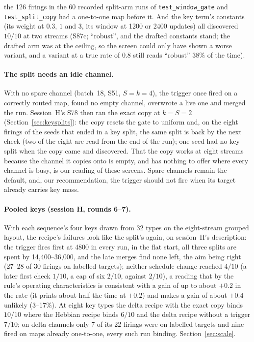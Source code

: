 \documentclass[11pt]{article}
\begin{document}
the 126 firings in the 60 recorded split-arm runs of \texttt{test\_window\_gate} and \texttt{test\_split\_copy} had a one-to-one map before it. And the key term's constants (its weight at $0.3$, $1$ and $3$, its window at 1200 or 2400 updates) all discovered $10/10$ at two streams (S87c; ``robust'', and the drafted constants stand; the drafted arm was at the ceiling, so the screen could only have shown a worse variant, and a variant at a true rate of $0.8$ still reads ``robust'' $38\%$ of the time).

\paragraph{The split needs an idle channel.} With no spare channel (batch~18, S51, $S = k = 4$), the trigger once fired on a correctly routed map, found no empty channel, overwrote a live one and merged the run. Session~H's S78 then ran the exact copy at $k = S = 2$ (Section~\ref{sec:keysplits}): the copy resets the gate to uniform and, on the eight firings of the seeds that ended in a key split, the same split is back by the next check (two of the eight are read from the end of the run); one seed had no key split when the copy came and discovered. That the copy works at eight streams because the channel it copies onto is empty, and has nothing to offer where every channel is busy, is our reading of these screens. Spare channels remain the default, and, our recommendation, the trigger should not fire when its target already carries key mass.

\paragraph{Pooled keys (session H, rounds 6--7).} With each sequence's four keys drawn from 32 types on the eight-stream grouped layout, the recipe's failures look like the split's again, on session~H's description: the trigger fires first at 4800 in every run, in the flat start, all three splits are spent by 14{,}400--36{,}000, and the late merges find none left, the aim being right (27--28 of 30 firings on labelled targets); neither schedule change reached $4/10$ (a later first check $1/10$, a cap of six $2/10$, against $2/10$), a reading that by the rule's operating characteristics is consistent with a gain of up to about $+0.2$ in the rate (it prints about half the time at $+0.2$) and makes a gain of about $+0.4$ unlikely (3--17\%). At eight key types the delta recipe with the exact copy binds $10/10$ where the Hebbian recipe binds $6/10$ and the delta recipe without a trigger $7/10$; on delta channels only 7 of its 22 firings were on labelled targets and nine fired on maps already one-to-one, every such run binding. Section~\ref{sec:scale}.
\end{document}
